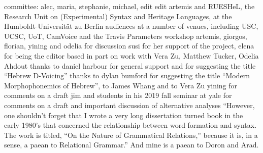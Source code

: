 \addchap{\lsAcknowledgementTitle} 

committee: alec, maria, stephanie, michael, edit
edit
artemis and RUESHeL, the Research Unit on (Experimental) Syntax and Heritage Languages, at the Humboldt-Universit\"at zu Berlin
audiences at a number of venues, including USC, UCSC, UoT, CamVoice and the Travis Parameters workshop
artemis, giorgos, florian, yining and odelia for discussion
susi for her support of the project, elena for being the editor
based in part on work with Vera Zu, Matthew Tucker, Odelia Ahdout
thanks to daniel harbour for general support and for suggesting the title ``Hebrew D-Voicing''
thanks to dylan bumford for suggesting the title ``Modern Morphophonemics of Hebrew'', to James Whang and to Vera Zu
yining for comments on a draft
jim and students in his 2019 fall seminar at yale for comments on a draft and important discussion of alternative analyses
``However, one shouldn’t forget that I wrote a very long dissertation turned book in the early 1980’s that concerned the relationship between word formation and syntax. The work is titled, “On the Nature of Grammatical Relations,” because it is, in a sense, a paean to Relational Grammar.'' And mine is a paean to Doron and Arad.
